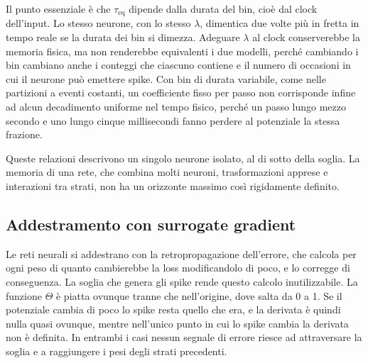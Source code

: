 Il punto essenziale è che $\tau_{\mathrm{eq}}$ dipende dalla durata del bin, cioè dal clock dell'input. Lo stesso neurone, con lo stesso $\lambda$, dimentica due volte più in fretta in tempo reale se la durata dei bin si dimezza. Adeguare $\lambda$ al clock conserverebbe la memoria fisica, ma non renderebbe equivalenti i due modelli, perché cambiando i bin cambiano anche i conteggi che ciascuno contiene e il numero di occasioni in cui il neurone può emettere spike. Con bin di durata variabile, come nelle partizioni a eventi costanti, un coefficiente fisso per passo non corrisponde infine ad alcun decadimento uniforme nel tempo fisico, perché un passo lungo mezzo secondo e uno lungo cinque millisecondi fanno perdere al potenziale la stessa frazione.

Queste relazioni descrivono un singolo neurone isolato, al di sotto della soglia. La memoria di una rete, che combina molti neuroni, trasformazioni apprese e interazioni tra strati, non ha un orizzonte massimo così rigidamente definito.

\subsection{Addestramento con surrogate gradient}
\label{subsec:surrogate_gradient}

Le reti neurali si addestrano con la retropropagazione dell'errore, che calcola per ogni peso di quanto cambierebbe la loss modificandolo di poco, e lo corregge di conseguenza. La soglia che genera gli spike rende questo calcolo inutilizzabile. La funzione $\Theta$ è piatta ovunque tranne che nell'origine, dove salta da 0 a 1. Se il potenziale cambia di poco lo spike resta quello che era, e la derivata è quindi nulla quasi ovunque, mentre nell'unico punto in cui lo spike cambia la derivata non è definita. In entrambi i casi nessun segnale di errore riesce ad attraversare la soglia e a raggiungere i pesi degli strati precedenti.

